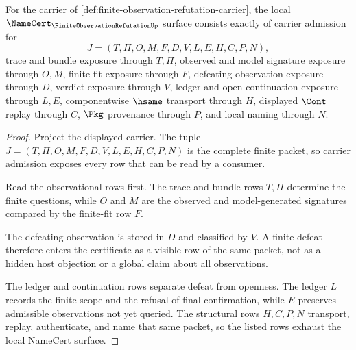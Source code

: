\begin{theorem}
\label{thm:finite-observation-refutation-namecert-obligations}
For the carrier of \autoref{def:finite-observation-refutation-carrier}, the local $\NameCert_{\FiniteObservationRefutationUp}$ surface consists exactly of carrier admission for
$$
J=(T,\Pi,O,M,F,D,V,L,E,H,C,P,N),
$$
trace and bundle exposure through $T,\Pi$, observed and model signature exposure through $O,M$, finite-fit exposure through $F$, defeating-observation exposure through $D$, verdict exposure through $V$, ledger and open-continuation exposure through $L,E$, componentwise $\hsame$ transport through $H$, displayed $\Cont$ replay through $C$, $\Pkg$ provenance through $P$, and local naming through $N$.
\end{theorem}
\begin{proof}
Project the displayed carrier. The tuple $J=(T,\Pi,O,M,F,D,V,L,E,H,C,P,N)$ is the complete finite packet, so carrier admission exposes every row that can be read by a consumer.

Read the observational rows first. The trace and bundle rows $T,\Pi$ determine the finite questions, while $O$ and $M$ are the observed and model-generated signatures compared by the finite-fit row $F$.

The defeating observation is stored in $D$ and classified by $V$. A finite defeat therefore enters the certificate as a visible row of the same packet, not as a hidden host objection or a global claim about all observations.

The ledger and continuation rows separate defeat from openness. The ledger $L$ records the finite scope and the refusal of final confirmation, while $E$ preserves admissible observations not yet queried. The structural rows $H,C,P,N$ transport, replay, authenticate, and name that same packet, so the listed rows exhaust the local NameCert surface.
\end{proof}

